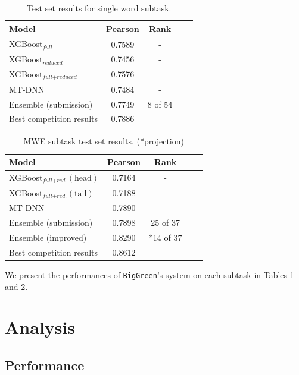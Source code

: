 \documentclass[11pt,a4paper]{article}
\begin{document}
\begin{table}
  \centering
  \begin{tabular}{lcccc}
  \hline \textbf{Model} & \textbf{Pearson} & \textbf{Rank} & \\ \hline
  XGBoost$_\textit{full}$ &	0.7589 & - \\
  XGBoost$_\textit{reduced}$ &	0.7456 & - \\
  XGBoost$_{\textit{full}+\textit{reduced}}$ & 0.7576 & - \\
  MT-DNN & 0.7484 & - \\
  Ensemble (submission) & 0.7749 & 8 of 54 \\
  \hline
  Best competition results & 0.7886 & \\ 
  \hline
  \end{tabular}
  \caption{\label{tab:single-word-results} Test set results for single word subtask.}
\end{table}

\begin{table}
  \centering
  \begin{tabular}{lcccc}
  \hline \textbf{Model} & \textbf{Pearson} & \textbf{Rank} \\ \hline
  XGBoost$_{\textit{full}+\textit{red.}}(\text{head})$ & 0.7164 & - \\
  XGBoost$_{\textit{full}+\textit{red.}}(\text{tail})$ & 0.7188 & - \\
  MT-DNN & 0.7890 & - \\
  Ensemble (submission) & 0.7898 & 25 of 37 \\
  Ensemble (improved) & 0.8290 & *14 of 37 \\
  \hline
  Best competition results & 0.8612 & \\ 
  \hline
  \end{tabular}
  \caption{\label{tab:multi-word-results} MWE subtask test set results. (*projection)}
\end{table}

We present the performances of \texttt{BigGreen}'s system on each subtask in Tables \ref{tab:single-word-results} and \ref{tab:multi-word-results}.

\section{Analysis}

\subsection{Performance}
\end{document}
